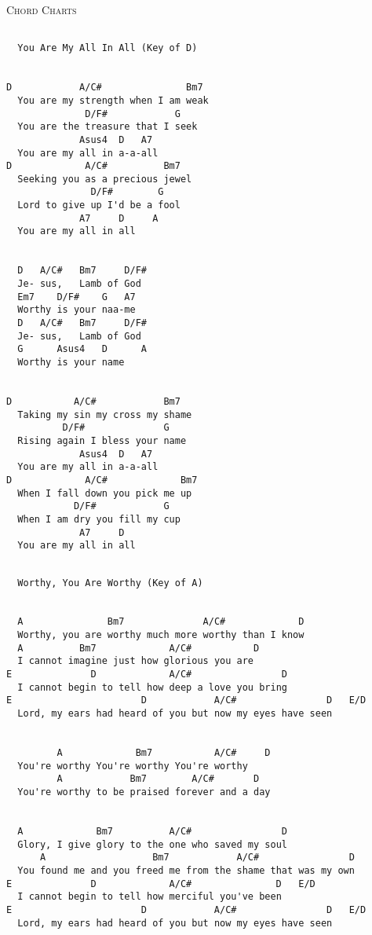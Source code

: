 \documentclass[10pt,oneside,footinclude=true,headinclude=true]{scrbook} %
\makeatletter
\newcommand{\verbatimfont}[1]{\renewcommand{\verbatim@font}{#1}}
\newcommand\songtitle[1]{
	\hspace*{-3.7mm}\LARGE\textsc{#1}
}
\makeatother
\begin{document}
\newpage
\bigskip  
\songtitle{Chord Charts}
\begin{verbatim}

  You Are My All In All (Key of D)
  
  
D            A/C#               Bm7
  You are my strength when I am weak
              D/F#            G
  You are the treasure that I seek
             Asus4  D   A7
  You are my all in a-a-all
D             A/C#          Bm7
  Seeking you as a precious jewel
               D/F#        G
  Lord to give up I'd be a fool
             A7     D     A
  You are my all in all
  
  
  D   A/C#   Bm7     D/F#
  Je- sus,   Lamb of God
  Em7    D/F#    G   A7
  Worthy is your naa-me
  D   A/C#   Bm7     D/F#
  Je- sus,   Lamb of God
  G      Asus4   D      A
  Worthy is your name
  
  
D           A/C#            Bm7
  Taking my sin my cross my shame
          D/F#              G
  Rising again I bless your name
             Asus4  D   A7
  You are my all in a-a-all
D             A/C#             Bm7
  When I fall down you pick me up
            D/F#            G
  When I am dry you fill my cup
             A7     D
  You are my all in all
\end{verbatim}
\verbatimfont{\ttfamily\Large}
\newpage
\bigskip  
\begin{verbatim}

  Worthy, You Are Worthy (Key of A)
  
  
  A               Bm7              A/C#             D
  Worthy, you are worthy much more worthy than I know
  A          Bm7             A/C#           D
  I cannot imagine just how glorious you are
E              D             A/C#                D
  I cannot begin to tell how deep a love you bring
E                       D            A/C#                D   E/D
  Lord, my ears had heard of you but now my eyes have seen
  
  
         A             Bm7           A/C#     D
  You're worthy You're worthy You're worthy
         A            Bm7        A/C#       D
  You're worthy to be praised forever and a day
  
  
  A             Bm7          A/C#                D
  Glory, I give glory to the one who saved my soul
      A                   Bm7            A/C#                D
  You found me and you freed me from the shame that was my own
E              D             A/C#               D   E/D
  I cannot begin to tell how merciful you've been
E                       D            A/C#                D   E/D
  Lord, my ears had heard of you but now my eyes have seen
\end{verbatim}
\end{document}
